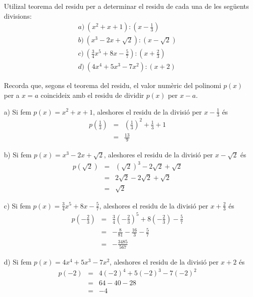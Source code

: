 \begin{exercici}
Utilizal teorema del residu per a determinar el residu de cada una de les
següents divisions:\[
\begin{array}{l}
a)~(x^{2}+x+1):\left( x-\frac{1}{3}\right) \\
b)~(x^{3}-2x+\sqrt{2}):(x-\sqrt{2}) \\
c)~\left( \frac{3}{4}x^{5}+8x-\frac{5}{7}\right):\left( x+\frac{2}{3}\right)
\\
d)~(4x^{4}+5x^{3}-7x^{2}):(x+2)\end{array}\]
\end{exercici}

\begin{solucio}
Recorda que, segons el teorema del residu, el valor numèric del
polinomi $p(x)$ per a $x=a$ coincideix amb el residu de dividir $p(x)$ per $x-a$.

a) Si fem $p(x)=x^{2}+x+1$, aleshores el residu de la divisió per $x-\frac{1}{3}$ és\begin{eqnarray*}
p\left( \frac{1}{3}\right) &=&\left( \frac{1}{3}\right) ^{2}+\frac{1}{3}+1 \\
&=&\frac{13}{9}
\end{eqnarray*}

b) Si fem $p(x)=x^{3}-2x+\sqrt{2}$, aleshores el residu de la divisió
per $x-\sqrt{2}$ és\begin{eqnarray*}
p\left( \sqrt{2}\right) &=&\left( \sqrt{2}\right) ^{3}-2\sqrt{2}+\sqrt{2} \\
&=&2\sqrt{2}-2\sqrt{2}+\sqrt{2} \\
&=&\sqrt{2}
\end{eqnarray*}

c) Si fem $p(x)=\frac{3}{4}x^{5}+8x-\frac{5}{7}$, aleshores el residu de
la divisió per $x+\frac{2}{3}$ és\begin{eqnarray*}
p\left( -\frac{2}{3}\right) &=&\frac{3}{4}\left( -\frac{2}{3}\right)
^{5}+8\left( -\frac{2}{3}\right) -\frac{5}{7} \\
&=&-\frac{8}{81}-\frac{16}{3}-\frac{5}{7} \\
&=&-\frac{3485}{567}
\end{eqnarray*}

d) Si fem $p(x)=4x^{4}+5x^{3}-7x^{2}$, aleshores el residu de la divisió per $x+2$ és\begin{eqnarray*}
p(-2) &=&4\left( -2\right) ^{4}+5\left( -2\right) ^{3}-7\left( -2\right) ^{2}
\\
&=&64-40-28 \\
&=&-4
\end{eqnarray*}
\end{solucio}

